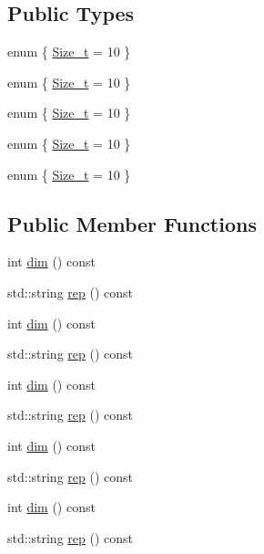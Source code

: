 \subsection*{Public Types}
\begin{DoxyCompactItemize}
\item 
enum \{ \mbox{\hyperlink{structHadron_1_1J9o2Rep_abcb5fc807f7caf4e46573ed3a4064a9ea09b9294087bdd9522fa9c8db5825d0db}{Size\+\_\+t}} = 10
 \}
\item 
enum \{ \mbox{\hyperlink{structHadron_1_1J9o2Rep_abcb5fc807f7caf4e46573ed3a4064a9ea09b9294087bdd9522fa9c8db5825d0db}{Size\+\_\+t}} = 10
 \}
\item 
enum \{ \mbox{\hyperlink{structHadron_1_1J9o2Rep_abcb5fc807f7caf4e46573ed3a4064a9ea09b9294087bdd9522fa9c8db5825d0db}{Size\+\_\+t}} = 10
 \}
\item 
enum \{ \mbox{\hyperlink{structHadron_1_1J9o2Rep_abcb5fc807f7caf4e46573ed3a4064a9ea09b9294087bdd9522fa9c8db5825d0db}{Size\+\_\+t}} = 10
 \}
\item 
enum \{ \mbox{\hyperlink{structHadron_1_1J9o2Rep_abcb5fc807f7caf4e46573ed3a4064a9ea09b9294087bdd9522fa9c8db5825d0db}{Size\+\_\+t}} = 10
 \}
\end{DoxyCompactItemize}
\subsection*{Public Member Functions}
\begin{DoxyCompactItemize}
\item 
int \mbox{\hyperlink{structHadron_1_1J9o2Rep_a66921d681b6217d1ef68bc63ad21cd15}{dim}} () const
\item 
std\+::string \mbox{\hyperlink{structHadron_1_1J9o2Rep_ad83e9b0b6221fcaeeeed5f2653890334}{rep}} () const
\item 
int \mbox{\hyperlink{structHadron_1_1J9o2Rep_a66921d681b6217d1ef68bc63ad21cd15}{dim}} () const
\item 
std\+::string \mbox{\hyperlink{structHadron_1_1J9o2Rep_ad83e9b0b6221fcaeeeed5f2653890334}{rep}} () const
\item 
int \mbox{\hyperlink{structHadron_1_1J9o2Rep_a66921d681b6217d1ef68bc63ad21cd15}{dim}} () const
\item 
std\+::string \mbox{\hyperlink{structHadron_1_1J9o2Rep_ad83e9b0b6221fcaeeeed5f2653890334}{rep}} () const
\item 
int \mbox{\hyperlink{structHadron_1_1J9o2Rep_a66921d681b6217d1ef68bc63ad21cd15}{dim}} () const
\item 
std\+::string \mbox{\hyperlink{structHadron_1_1J9o2Rep_ad83e9b0b6221fcaeeeed5f2653890334}{rep}} () const
\item 
int \mbox{\hyperlink{structHadron_1_1J9o2Rep_a66921d681b6217d1ef68bc63ad21cd15}{dim}} () const
\item 
std\+::string \mbox{\hyperlink{structHadron_1_1J9o2Rep_ad83e9b0b6221fcaeeeed5f2653890334}{rep}} () const
\end{DoxyCompactItemize}


